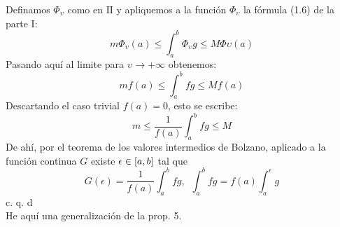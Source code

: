 Definamos $\Phi_\upsilon$ como en $\mathrm{II}$ y apliquemos a la función $\Phi_\upsilon$ la fórmula (1.6) de la parte $\mathrm{I}$:
\begin{equation*}
m\Phi_\upsilon (a) \leq \int_a^b \Phi_\upsilon g \leq M \Phi \upsilon (a)
\end{equation*}
Pasando aquí al limite para $\upsilon \to +\infty$ obtenemos:
\begin{equation*}
mf(a) \leq \int_a^b fg  \leq M f(a)
\end{equation*}
Descartando el caso trivial $f(a)=0$, esto se escribe:
\begin{equation*}
m \leq \frac{1}{f(a)} \int_a ^b fg \leq M
\end{equation*}
De ahí, por el teorema de los valores intermedios de Bolzano, aplicado a la función continua $G$ existe $\epsilon \in [a,b]$ tal que
$$
G(\epsilon)=\frac{1}{f(a)} \int_a^b fg, \phantom{s} \int_a ^b fg=f(a) \int_a^\epsilon g
$$
\hspace{11cm} c. q. d \\
He aquí una generalización de la prop. 5. \\

